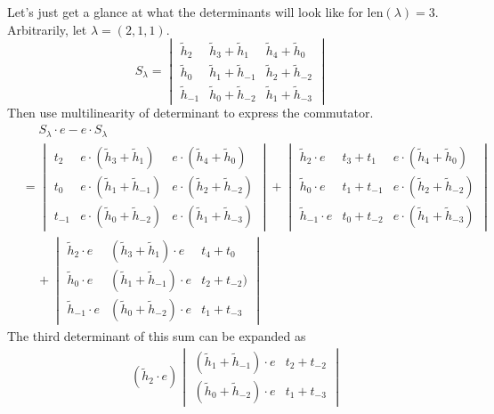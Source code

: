 \begin{example}
Let's just get a glance at what the determinants will look like for $\textrm{len}(\lambda)=3$. Arbitrarily, let $\lambda = (2, 1, 1)$. 
\[
S_\lambda = 
\begin{vmatrix}
\tilde{h}_2 & \tilde{h}_3 + \tilde{h}_1 & \tilde{h}_4 + \tilde{h}_0 \\
\tilde{h}_0 & \tilde{h}_1 + \tilde{h}_{-1} & \tilde{h}_2 + \tilde{h}_{-2} \\
\tilde{h}_{-1} & \tilde{h}_0 + \tilde{h}_{-2} & \tilde{h}_1 + \tilde{h}_{-3}
\end{vmatrix}
\]
Then use multilinearity of determinant to express the commutator.
\begin{align*}
&\quad\,\, S_\lambda \cdot e - e \cdot S_\lambda \\
&=\begin{vmatrix}
t_2 & e \cdot (\tilde{h}_3 + \tilde{h}_1 ) & e \cdot ( \tilde{h}_4 + \tilde{h}_0 ) \\
t_0 & e \cdot ( \tilde{h}_1 + \tilde{h}_{-1} ) & e \cdot ( \tilde{h}_2  + \tilde{h}_{-2} ) \\
t_{-1} & e \cdot ( \tilde{h}_0 + \tilde{h}_{-2} ) & e \cdot ( \tilde{h}_1 + \tilde{h}_{-3} )
\end{vmatrix}
+
\begin{vmatrix}
\tilde{h}_2 \cdot e & t_3 + t_1 & e \cdot ( \tilde{h}_4 + \tilde{h}_0 ) \\
\tilde{h}_0 \cdot e & t_1 + t_{-1} & e \cdot ( \tilde{h}_2  + \tilde{h}_{-2} ) \\
\tilde{h}_{-1} \cdot e & t_0 + t_{-2} & e \cdot ( \tilde{h}_1 + \tilde{h}_{-3} )
\end{vmatrix} \\
&\quad\,+
\begin{vmatrix}
\tilde{h}_2 \cdot e & ( \tilde{h}_3 + \tilde{h}_1 ) \cdot e & t_4 + t_0 \\
\tilde{h}_0 \cdot e & ( \tilde{h}_1 + \tilde{h}_{-1} ) \cdot e & t_2  + t_{-2} ) \\
\tilde{h}_{-1} \cdot e & ( \tilde{h}_0 + \tilde{h}_{-2} ) \cdot e & t_1 + t_{-3}
\end{vmatrix}
\end{align*}
The third determinant of this sum can be expanded as
\begin{align*}
&( \tilde{h}_2 \cdot e )
\begin{vmatrix}
( \tilde{h}_1 + \tilde{h}_{-1} ) \cdot e & t_2 + t_{-2} \\
( \tilde{h}_0 + \tilde{h}_{-2} ) \cdot e & t_1 + t_{-3}

\end{vmatrix}
\end{align*}
\end{example}
